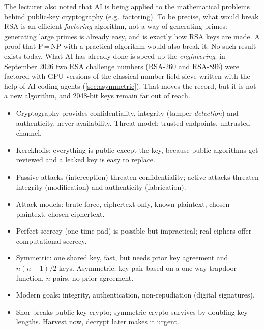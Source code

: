 \begin{remark}
The lecturer also noted that AI is being applied to the mathematical problems behind public-key cryptography (e.g.\ factoring). To be precise, what would break RSA is an efficient \emph{factoring} algorithm, not a way of generating primes: generating large primes is already easy, and is exactly how RSA keys are made. A proof that P\,=\,NP with a practical algorithm would also break it. No such result exists today. What AI has already done is speed up the \emph{engineering}: in September 2026 two RSA challenge numbers (RSA-260 and RSA-896) were factored with GPU versions of the classical number field sieve written with the help of AI coding agents (\cref{sec:asymmetric}). That moves the record, but it is not a new algorithm, and 2048-bit keys remain far out of reach.
\end{remark}

\begin{summary}
\begin{itemize}
    \item Cryptography provides confidentiality, integrity (tamper \emph{detection}) and authenticity, never availability. Threat model: trusted endpoints, untrusted channel.
    \item Kerckhoffs: everything is public except the key, because public algorithms get reviewed and a leaked key is easy to replace.
    \item Passive attacks (interception) threaten confidentiality; active attacks threaten integrity (modification) and authenticity (fabrication).
    \item Attack models: brute force, ciphertext only, known plaintext, chosen plaintext, chosen ciphertext.
    \item Perfect secrecy (one-time pad) is possible but impractical; real ciphers offer computational secrecy.
    \item Symmetric: one shared key, fast, but needs prior key agreement and $n(n-1)/2$ keys. Asymmetric: key pair based on a one-way trapdoor function, $n$ pairs, no prior agreement.
    \item Modern goals: integrity, authentication, non-repudiation (digital signatures).
    \item Shor breaks public-key crypto; symmetric crypto survives by doubling key lengths. Harvest now, decrypt later makes it urgent.
\end{itemize}
\end{summary}

